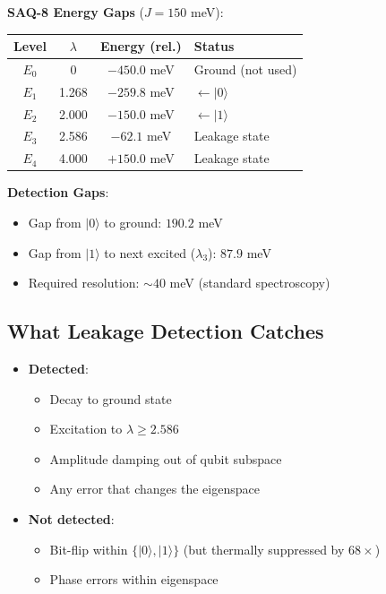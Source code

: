\documentclass[11pt,a4paper]{article}
\theoremstyle{definition}
\newcommand{\ket}[1]{|#1\rangle}
\begin{document}
\begin{engineering}
\textbf{SAQ-8 Energy Gaps} ($J = 150$ meV):
\begin{center}
\begin{tabular}{cccl}
\toprule
Level & $\lambda$ & Energy (rel.) & Status \\
\midrule
$E_0$ & 0 & $-450.0$ meV & Ground (not used) \\
$E_1$ & 1.268 & $-259.8$ meV & $\leftarrow \ket{0}$ \\
$E_2$ & 2.000 & $-150.0$ meV & $\leftarrow \ket{1}$ \\
$E_3$ & 2.586 & $-62.1$ meV & Leakage state \\
$E_4$ & 4.000 & $+150.0$ meV & Leakage state \\
\bottomrule
\end{tabular}
\end{center}

\textbf{Detection Gaps}:
\begin{itemize}[noitemsep]
    \item Gap from $\ket{0}$ to ground: $190.2$ meV
    \item Gap from $\ket{1}$ to next excited ($\lambda_3$): $87.9$ meV
    \item Required resolution: $\sim 40$ meV (standard spectroscopy)
\end{itemize}
\end{engineering}

\subsection{What Leakage Detection Catches}

\begin{itemize}
    \item \textbf{Detected}: 
    \begin{itemize}[noitemsep]
        \item Decay to ground state
        \item Excitation to $\lambda \geq 2.586$
        \item Amplitude damping out of qubit subspace
        \item Any error that changes the eigenspace
    \end{itemize}
    \item \textbf{Not detected}: 
    \begin{itemize}[noitemsep]
        \item Bit-flip within $\{\ket{0}, \ket{1}\}$ (but thermally suppressed by $68\times$)
        \item Phase errors within eigenspace
    \end{itemize}
\end{itemize}
\end{document}
